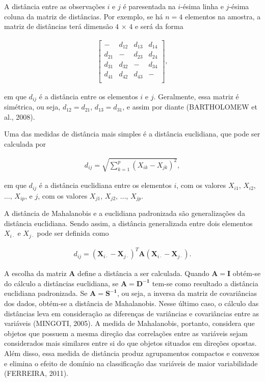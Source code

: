 \documentclass[12pt, a4paper,brazil,oneside]{article}
\begin{document}
	A distância entre as observações $i$ e $j$ é paresentada na $i$-ésima linha e $j$-ésima coluna da matriz de distâncias. Por exemplo, se há $n = 4$ elementos na amostra, a matriz de distâncias terá dimensão $4$ $\times$ $4$ e será da forma
	
	\begin{align*}
	\left[
	\begin{array}{cccc}
	- & d_{12} & d_{13} & d_{14}\\
	d_{21} & - & d_{23} & d_{24}\\
	d_{31} & d_{32} & - & d_{34}\\
	d_{41} & d_{42} & d_{43} & -\\
	\end{array}
	\right],
	\end{align*}
	
	\noindent em que $d_{ij}$ é a distância entre os elementos $i$ e $j$. Geralmente, essa matriz é simétrica, ou seja, $d_{12}=d_{21}$, $d_{13}=d_{31}$, e assim por diante (BARTHOLOMEW et al., 2008).
	
	Uma das medidas de distância mais simples é a distância euclidiana, que pode ser calculada por 
	
	\begin{align*}
	d_{ij} = \sqrt{\sum_{k = 1}^{p}(X_{ik} - X_{jk})^2},
	\end{align*}
	
	\noindent em que $d_{ij}$ é a distância euclidiana entre os elementos $i$, com os valores $X_{i1}$, $X_{i2}$, $\dots$, $X_{ip}$, e $j$, com os valores $X_{j1}$, $X_{j2}$, $\dots$, $X_{jp}$.
	
	A distância de Mahalanobis e a euclidiana padronizada são generalizações da distância euclidiana. Sendo assim, a distância generalizada entre dois elementos $X_{i\cdot}$ e $X_{j\cdot}$ pode ser definida como  
	
	
	\begin{align}
	d_{ij} = (\boldsymbol{X}_{i\cdot} - \boldsymbol{X}_{j\cdot})^T \boldsymbol{A}(\boldsymbol{X}_{i\cdot} - \boldsymbol{X}_{j\cdot}). 
	\end{align}
	
	A escolha da matriz $\boldsymbol{A}$ define a distância a ser calculada. Quando $\boldsymbol{A}= \boldsymbol{I}$ obtém-se do cálculo a distâncias euclidiana, se $\boldsymbol{A}= \boldsymbol{D^{-1}}$ tem-se como resultado a distância euclidiana padronizada. Se $\boldsymbol{A}= \boldsymbol{S^{-1}}$, ou seja, a inversa da matriz de covariâncias dos dados, obtém-se a distância de Mahalanobis. Nesse último caso, o cálculo das distâncias leva em consideração as diferenças de variâncias e covariâncias entre as variáveis (MINGOTI, 2005). A medida de Mahalanobis, portanto, considera que objetos que possuem a mesma direção das correlações entre as variáveis sejam considerados mais similares entre si do que objetos situados em direções opostas. Além disso, essa medida de distância produz agrupamentos compactos e convexos e elimina o efeito de domínio na classificação das variáveis de maior variabilidade (FERREIRA, 2011).
	
\end{document}
